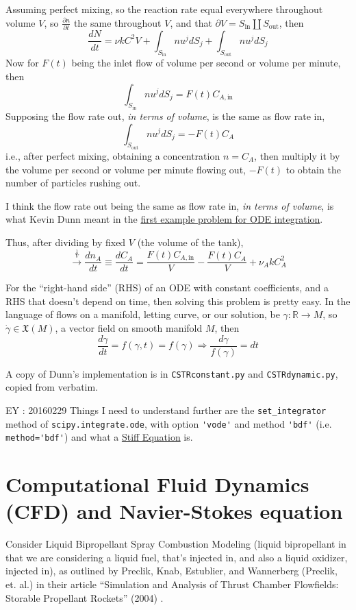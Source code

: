 \documentclass[10pt]{amsart}
\begin{document}
\begin{multicols*}{2}
Assuming perfect mixing, so the reaction rate equal everywhere throughout volume $V$, so $\frac{ \partial n}{ \partial t}$ the same throughout $V$, and that $\partial V = S_{\text{in}} \coprod S_{\text{out}}$, then
\[
\frac{dN}{dt} = \nu k C^2 V + \int_{S_{\text{in}} } nu^j dS_j + \int_{S_{\text{out}}} nu^j dS_j
\]
Now for $F(t)$ being the inlet flow of volume per second or volume per minute, then
\[
\int_{S_{\text{in}}} nu^j dS_j = F(t) C_{A,\text{in}}
\]
Supposing the flow rate out, \emph{in terms of volume}, is the same as flow rate in,
\[
\int_{S_{\text{out}} } nu^j dS_j = -F(t) C_A
\]
i.e., after perfect mixing, obtaining a concentration $n=C_A$, then multiply it by the volume per second or volume per minute flowing out, $-F(t)$ to obtain the number of particles rushing out.  

I think the flow rate out being the same as flow rate in, \emph{in terms of volume}, is what Kevin Dunn meant in the \href{http://modelling3e4.connectmv.com/wiki/Software_tutorial/Integration_of_ODEs}{first example problem for ODE integration}.  

Thus, after dividing by fixed $V$ (the volume of the tank), 
\[
\xrightarrow{ \frac{1}{V} } \frac{dn_A}{dt} \equiv \frac{dC_A}{dt} = \frac{F(t)C_{A,\text{in}}}{V} - \frac{F(t)C_A}{V} + \nu_A k C_A^2 
\]

For the ``right-hand side'' (RHS) of an ODE with constant coefficients, and a RHS that doesn't depend on time, then solving this problem is pretty easy.  In the language of flows on a manifold, letting curve, or our solution, be $\gamma :\mathbb{R} \to M$, so $\dot{\gamma} \in \mathfrak{X}(M)$, a vector field on smooth manifold $M$, then
\[
\frac{d\gamma}{dt} = f(\gamma,t) = f(\gamma) \Longrightarrow \frac{d\gamma}{f(\gamma)} = dt
\]

A copy of Dunn's implementation is in \verb|CSTRconstant.py| and \verb|CSTRdynamic.py|, copied from verbatim.  

EY : 20160229 Things I need to understand further are the \verb|set_integrator| method of \verb|scipy.integrate.ode|, with option \verb|'vode'| and method \verb|'bdf'| (i.e. \verb|method='bdf'|) and what a \href{https://en.wikipedia.org/wiki/Stiff_equation}{Stiff Equation} is. 

\section{Computational Fluid Dynamics (CFD) and Navier-Stokes equation}

Consider Liquid Bipropellant Spray Combustion Modeling (liquid bipropellant in that we are considering a liquid fuel, that's injected in, and also a liquid oxidizer, injected in), as outlined by Preclik, Knab, Estublier, and Wannerberg (Preclik, et. al.) in their article ``Simulation and Analysis of Thrust Chamber Flowfields: Storable Propellant Rockets'' (2004) \cite{YHHP2004}.  


\end{multicols*}
\end{document}
